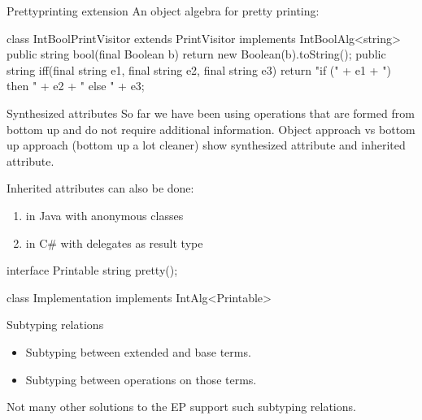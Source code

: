\documentclass[10pt, compress]{beamer}
\newenvironment{slide}[1]{\begin{frame}[fragile,environment=slide]{#1}}{\end{frame}}
\newenvironment{slide}[2]{\begin{frame}[fragile,environment=slide]{#1}{#2}}{\end{frame}}
\begin{document}
\begin{slide}{Prettyprinting extension}
An object algebra for pretty printing:
\begin{java}
class IntBoolPrintVisitor extends PrintVisitor 
                          implements IntBoolAlg<string> {
  public string bool(final Boolean b) {
    return new Boolean(b).toString();
  }
  public string iff(final string e1, final string e2, final string e3) {
    return "if (" + e1 + ") then " + e2 + " else " + e3;
  }
}
\end{java}
\end{slide}



\begin{slide}{Synthesized attributes}
So far we have been using operations that are formed from bottom up and do not require additional information.
Object approach vs bottom up approach (bottom up a lot cleaner)
show synthesized attribute and inherited attribute.

Inherited attributes can also be done:
\begin{enumerate}
\item in Java with anonymous classes
\item in C\# with delegates as result type
\end{enumerate}

\begin{java}
interface Printable {
  string pretty();
}

class Implementation implements IntAlg<Printable>
{
  
}

\end{java}
\end{slide}



\begin{slide}{Subtyping relations}
\begin{itemize}
\item Subtyping between extended and base terms. 
\item Subtyping between operations on those terms.
\end{itemize}
Not many other solutions to the EP support such subtyping relations.
\end{slide}
\end{document}
